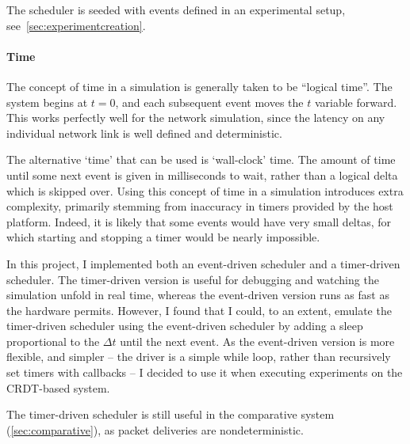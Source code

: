 \documentclass[12pt,a4paper,twoside,openright]{report}
\begin{document}
		The scheduler is seeded with events defined in an experimental setup, see~\cref{sec:experimentcreation}.
		
		\paragraph{Time} \label{sec:rtscheduler}
		The concept of time in a simulation is generally taken to be ``logical time''. The system begins at $t = 0$, and each subsequent event moves the $t$ variable forward. This works perfectly well for the network simulation, since the latency on any individual network link is well defined and deterministic.
		
		The alternative `time' that can be used is `wall-clock' time. The amount of time until some next event is given in milliseconds to wait, rather than a logical delta which is skipped over. Using this concept of time in a simulation introduces extra complexity, primarily stemming from inaccuracy in timers provided by the host platform. Indeed, it is likely that some events would have very small deltas, for which starting and stopping a timer would be nearly impossible. 
		
		In this project, I implemented both an event-driven scheduler and a timer-driven scheduler. The timer-driven version is useful for debugging and watching the simulation unfold in real time, whereas the event-driven version runs as fast as the hardware permits. However, I found that I could, to an extent, emulate the timer-driven scheduler using the event-driven scheduler by adding a sleep proportional to the $\Delta t$ until the next event. As the event-driven version is more flexible, and simpler -- the driver is a simple while loop, rather than recursively set timers with callbacks -- I decided to use it when executing experiments on the CRDT-based system.
		
		The timer-driven scheduler is still useful in the comparative system (\cref{sec:comparative}), as packet deliveries are nondeterministic.
		
\end{document}
